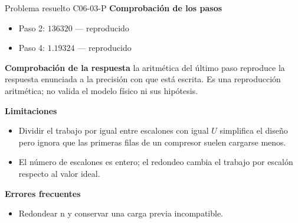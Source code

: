 \documentclass[10pt,openany]{book}
\begin{document}
\begin{studiumworked}{Problema resuelto C06-03-P}
\noindent\textbf{Comprobación de los pasos}
\begin{itemize}
\item Paso 2: $136320$ — reproducido
\item Paso 4: $1.19324$ — reproducido
\end{itemize}

\noindent\textbf{Comprobación de la respuesta} la aritmética del último paso reproduce la respuesta enunciada a la precisión con que está escrita. Es una reproducción aritmética; no valida el modelo físico ni sus hipótesis.

\noindent\textbf{Limitaciones}
\begin{itemize}
\item Dividir el trabajo por igual entre escalones con igual $U$ simplifica el diseño pero ignora que las primeras filas de un compresor suelen cargarse menos.
\item El número de escalones es entero; el redondeo cambia el trabajo por escalón respecto al valor ideal.
\end{itemize}

\noindent\textbf{Errores frecuentes}
\begin{itemize}
\item Redondear n y conservar una carga previa incompatible.
\end{itemize}
\end{studiumworked}
\end{document}
